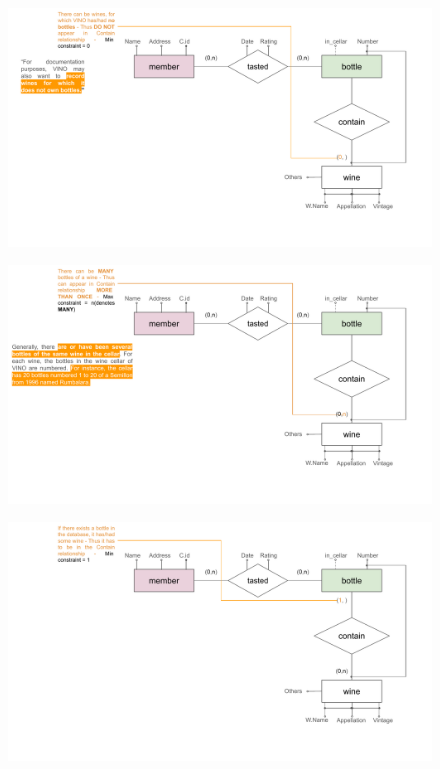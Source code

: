 \documentclass{beamer}
\begin{document}
\begin{frame}
    \begin{figure}
        \centering
        \includegraphics[width=1.1\linewidth]{tut_02_files/15.pdf}
    \end{figure}
\end{frame}

\begin{frame}
    \begin{figure}
        \centering
        \includegraphics[width=1.1\linewidth]{tut_02_files/16.pdf}
    \end{figure}
\end{frame}

\begin{frame}
    \begin{figure}
        \centering
        \includegraphics[width=1.1\linewidth]{tut_02_files/17.pdf}
    \end{figure}
\end{frame}
\end{document}
